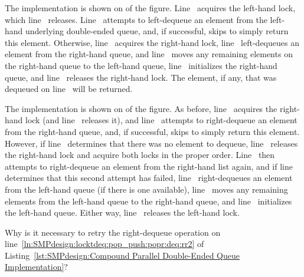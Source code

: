 \begin{fcvref}
The  implementation is shown on
of the figure.
Line~ acquires the left-hand lock,
which line~ releases.
Line~ attempts to left-dequeue an element
from the left-hand underlying
double-ended queue, and, if successful,
skips  to simply
return this element.
Otherwise, line~ acquires the right-hand lock, line~
left-dequeues an element from the right-hand queue,
and line~ moves any remaining elements on the right-hand
queue to the left-hand queue, line~ initializes
the right-hand queue,
and line~ releases the right-hand lock.
The element, if any, that was dequeued on line~ will be returned.
\end{fcvref}

\begin{fcvref}
The  implementation is shown on 
of the figure.
As before, line~ acquires the right-hand lock
(and line~
releases it), and line~ attempts to right-dequeue an element
from the right-hand queue, and, if successful,
skips 
to simply return this element.
However, if line~ determines that there was no element to dequeue,
line~ releases the right-hand lock and
 acquire both
locks in the proper order.
Line~ then attempts to right-dequeue an element
from the right-hand
list again, and if line~ determines that this second attempt has
failed, line~ right-dequeues an element from the left-hand queue
(if there is one available), line~ moves any remaining elements
from the left-hand queue to the right-hand queue, and line~
initializes the left-hand queue.
Either way, line~ releases the left-hand lock.
\end{fcvref}

\QuickQuiz{}
	Why is it necessary to retry the right-dequeue operation
	on line~\ref{ln:SMPdesign:locktdeq:pop_push:popr:deq:rr2} of
	Listing~\ref{lst:SMPdesign:Compound Parallel Double-Ended Queue Implementation}?
 \QuickQuizEnd

